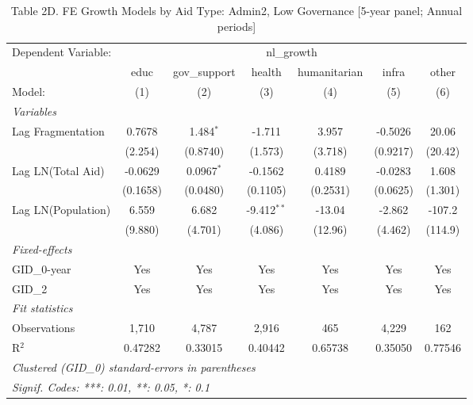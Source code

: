 
\begin{table}[H]
   \caption{Table 2D. FE Growth Models by Aid Type: Admin2, Low Governance [5-year panel; Annual periods]}
   \centering
   \begin{tabular}{lcccccc}
      \tabularnewline \midrule \midrule
      Dependent Variable: & \multicolumn{6}{c}{nl\_growth}\\
                         & educ     & gov\_support  & health        & humanitarian & infra    & other \\   
      Model:             & (1)      & (2)           & (3)           & (4)          & (5)      & (6)\\  
      \midrule
      \emph{Variables}\\
      Lag Fragmentation  & 0.7678   & 1.484$^{*}$   & -1.711        & 3.957        & -0.5026  & 20.06\\   
                         & (2.254)  & (0.8740)      & (1.573)       & (3.718)      & (0.9217) & (20.42)\\   
      Lag LN(Total Aid)  & -0.0629  & 0.0967$^{*}$  & -0.1562       & 0.4189       & -0.0283  & 1.608\\   
                         & (0.1658) & (0.0480)      & (0.1105)      & (0.2531)     & (0.0625) & (1.301)\\   
      Lag LN(Population) & 6.559    & 6.682         & -9.412$^{**}$ & -13.04       & -2.862   & -107.2\\   
                         & (9.880)  & (4.701)       & (4.086)       & (12.96)      & (4.462)  & (114.9)\\   
      \midrule
      \emph{Fixed-effects}\\
      GID\_0-year        & Yes      & Yes           & Yes           & Yes          & Yes      & Yes\\  
      GID\_2             & Yes      & Yes           & Yes           & Yes          & Yes      & Yes\\  
      \midrule
      \emph{Fit statistics}\\
      Observations       & 1,710    & 4,787         & 2,916         & 465          & 4,229    & 162\\  
      R$^2$              & 0.47282  & 0.33015       & 0.40442       & 0.65738      & 0.35050  & 0.77546\\  
      \midrule \midrule
      \multicolumn{7}{l}{\emph{Clustered (GID\_0) standard-errors in parentheses}}\\
      \multicolumn{7}{l}{\emph{Signif. Codes: ***: 0.01, **: 0.05, *: 0.1}}\\
   \end{tabular}
\end{table}


